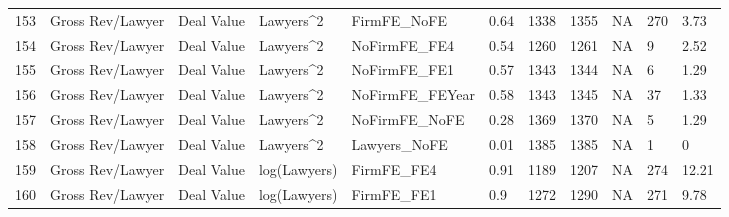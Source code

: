 \documentclass{article}
\begin{document}
\begin{table}[H]
\begin{tabular}{rllllllllll}
  153 & Gross Rev/Lawyer & Deal Value & Lawyers^2 & FirmFE\_NoFE & 0.64 & 1338 & 1355 & NA & 270 & 3.73 \\
  154 & Gross Rev/Lawyer & Deal Value & Lawyers^2 & NoFirmFE\_FE4 & 0.54 & 1260 & 1261 & NA & 9 & 2.52 \\
  155 & Gross Rev/Lawyer & Deal Value & Lawyers^2 & NoFirmFE\_FE1 & 0.57 & 1343 & 1344 & NA & 6 & 1.29 \\
  156 & Gross Rev/Lawyer & Deal Value & Lawyers^2 & NoFirmFE\_FEYear & 0.58 & 1343 & 1345 & NA & 37 & 1.33 \\
  157 & Gross Rev/Lawyer & Deal Value & Lawyers^2 & NoFirmFE\_NoFE & 0.28 & 1369 & 1370 & NA & 5 & 1.29 \\
  158 & Gross Rev/Lawyer & Deal Value & Lawyers^2 & Lawyers\_NoFE & 0.01 & 1385 & 1385 & NA & 1 & 0 \\
  159 & Gross Rev/Lawyer & Deal Value & log(Lawyers) & FirmFE\_FE4 & 0.91 & 1189 & 1207 & NA & 274 & 12.21 \\
  160 & Gross Rev/Lawyer & Deal Value & log(Lawyers) & FirmFE\_FE1 & 0.9 & 1272 & 1290 & NA & 271 & 9.78 \\
   \hline
\end{tabular}
\end{table}
\end{document}
